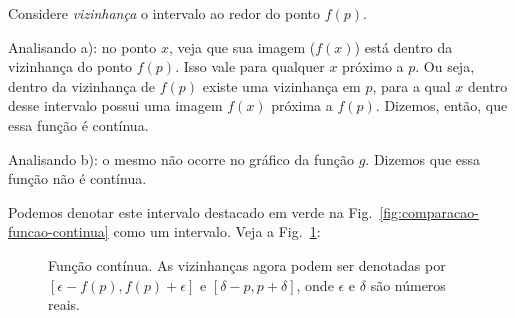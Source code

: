 \documentclass[12pt,openright,twoside,a4paper]{article}
\theoremstyle{definition}
\begin{document}
	Considere \textit{vizinhança }o intervalo ao redor do ponto $f(p)$. 
	
	Analisando a): no ponto $x$, veja que sua imagem ($f(x)$) está dentro da vizinhança do ponto $f(p)$. Isso vale para qualquer $x$ próximo a $p$. Ou seja, dentro da vizinhança de $f(p)$ existe uma vizinhança em $p$, para a qual $x$ dentro desse intervalo possui uma imagem $f(x)$ próxima a $f(p)$. Dizemos, então, que essa função é contínua.
	
	Analisando b): o mesmo não ocorre no gráfico da função $g$. Dizemos que essa função não é contínua.
	
	Podemos denotar este intervalo destacado em verde na Fig.~\ref{fig:comparacao-funcao-continua} como um intervalo. Veja a Fig.~\ref{fig:epsilon_delta}: 
	
		\begin{figure}[h]
		\centering
		\caption{Função contínua. As vizinhanças agora podem ser denotadas por $\left[ \epsilon - f(p), f(p) + \epsilon \right]$ e $\left[ \delta - p, p + \delta \right]$, onde $\epsilon$ e $\delta$ são números reais.}
		\label{fig:epsilon_delta}
	\end{figure}
	
	\pagebreak
	
\end{document}
